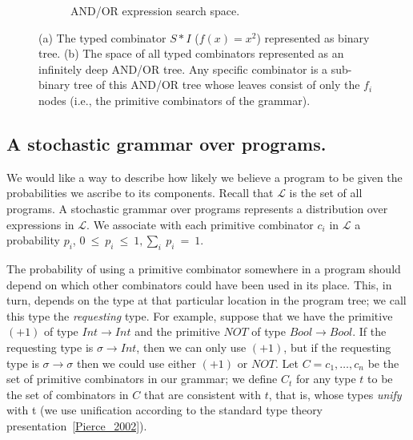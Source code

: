 \documentclass{article}
\begin{document}
\begin{figure}
\begin{subfigure}[R]{0.5\linewidth}
    \caption{AND/OR expression search space. }
    \label{fig:andor}
    \end{subfigure}
  \caption{(a) The typed combinator $S * I$ ($f(x)=x^2$) represented as
    binary tree. (b) The space of all typed combinators represented as an
    infinitely deep AND/OR tree. Any specific combinator is a
    sub-binary tree of this AND/OR tree whose leaves consist of only
    the $f_i$ nodes (i.e., the primitive combinators of the grammar).}

\end{figure}

\subsection{A stochastic grammar over programs.}
\label{sec:stochgrammar}
We would like a way to describe how likely we believe a program to be
given the probabilities we ascribe to its components. Recall that
$\mathcal{L}$ is the set of all programs.  A stochastic grammar over
programs represents a distribution over expressions in
$\mathcal{L}$. We associate with each primitive combinator $c_i$ in
$\mathcal{L}$ a probability $p_i$, $0~\leq~p_i~\leq~1, \sum_i~p_i~=~1
$.

The probability of using a primitive combinator somewhere in a program
should depend on which other combinators could have been used in its
place. This, in turn, depends on the type at that particular location
in the program tree; we call this type the \emph{requesting} type. For
example, suppose that we have the primitive $(+1)$ of type $Int
\rightarrow Int$ and the primitive $NOT$ of type $Bool \rightarrow
Bool$. If the requesting type is $\sigma \rightarrow Int$, then we can
only use $(+1)$, but if the requesting type is $\sigma \rightarrow
\sigma$ then we could use either $(+1)$ or $NOT$. Let $C = c_1, \dots,
c_n$ be the set of primitive combinators in our grammar; we define
$C_t$ for any type $t$ to be the set of combinators in $C$ that are
consistent with $t$, that is, whose types \emph{unify} with t (we use
unification according to the standard type theory
presentation~\ref{Pierce_2002}).
\end{document}
